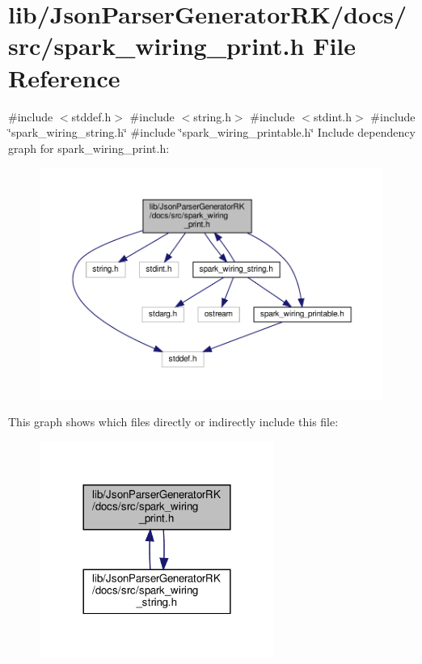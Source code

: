 \section{lib/\+Json\+Parser\+Generator\+R\+K/docs/src/spark\+\_\+wiring\+\_\+print.h File Reference}
\label{docs_2src_2spark__wiring__print_8h}
{\ttfamily \#include $<$stddef.\+h$>$}\newline
{\ttfamily \#include $<$string.\+h$>$}\newline
{\ttfamily \#include $<$stdint.\+h$>$}\newline
{\ttfamily \#include \char`\"{}spark\+\_\+wiring\+\_\+string.\+h\char`\"{}}\newline
{\ttfamily \#include \char`\"{}spark\+\_\+wiring\+\_\+printable.\+h\char`\"{}}\newline
Include dependency graph for spark\+\_\+wiring\+\_\+print.\+h\+:\nopagebreak
\begin{figure}[H]
\begin{center}
\leavevmode
\includegraphics[width=350pt]{docs_2src_2spark__wiring__print_8h__incl}
\end{center}
\end{figure}
This graph shows which files directly or indirectly include this file\+:\nopagebreak
\begin{figure}[H]
\begin{center}
\leavevmode
\includegraphics[width=216pt]{docs_2src_2spark__wiring__print_8h__dep__incl}
\end{center}
\end{figure}
